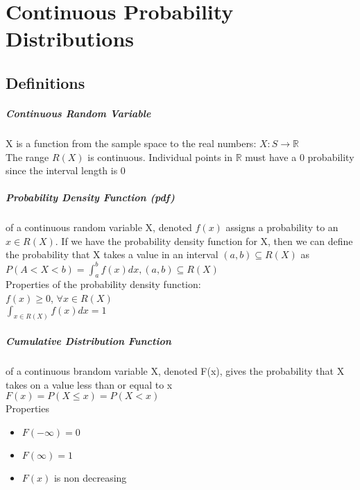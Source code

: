 \chapter{Continuous Probability Distributions}
  \section{Definitions}
    \paragraph{Continuous Random Variable} X is a function from the sample
    space to the real numbers: $X : S \rightarrow \mathbb{R}$\\
    The range $R(X)$ is continuous. Individual points in $\mathbb{R}$ must have
    a 0 probability since the interval length is 0\\

    \paragraph{Probability Density Function (pdf)} of a continuous random
    variable X, denoted $f(x)$ assigns a probability to an $x \in R(X)$. If we
    have the probability density function for X, then we can define the
    probability that X takes a value in an interval $(a, b) \subseteq R(X)$ as
    $P(A < X < b) = \int_{a}^{b} f(x)dx, (a, b) \subseteq R(X)$\\
    Properties of the probability density function:\\
    $f(x) \geq 0$, $\forall x \in R(X)$\\
    $\int_{x\in R(X)} f(x)dx = 1$

    \paragraph{Cumulative Distribution Function} of a continuous brandom
    variable X, denoted F(x), gives the probability that X takes on a value
    less than or equal to x\\
    $F(x) = P(X \leq x) = P(X < x)$\\
    Properties
    \begin{itemize}
      \item $F(-\infty) = 0$
      \item $F(\infty) = 1$
      \item $F(x)$ is non decreasing
    \end{itemize}

